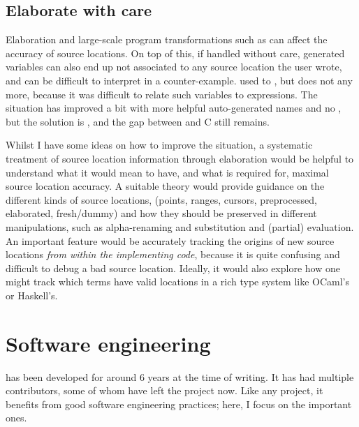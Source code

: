 \subsection{Elaborate with care}

Elaboration and large-scale program transformations such as  can
affect the accuracy of source locations. On top of this, if handled without
care, generated variables can also end up not associated to any source location
the user wrote, and can be difficult to interpret in a counter-example. 
used to , but does not any
more, because it was difficult to relate such variables to 
expressions. The situation has improved a bit with more helpful auto-generated
names and no , but the solution is \adhoc{}, and the gap between
 and C still remains.

Whilst I have some ideas on how to improve the situation, a systematic treatment of source location information through
elaboration would be helpful to understand what it would mean to have, and what is
required for, maximal source location accuracy. A suitable theory would provide
guidance on the different kinds of source locations, (points, ranges, cursors,
preprocessed, elaborated, fresh/dummy) and how they should be preserved in
different manipulations, such as alpha-renaming and substitution and (partial)
evaluation. An important feature would be accurately tracking the origins of
new source locations \emph{from within the implementing code}, because it is
quite confusing and difficult to debug a bad source location. Ideally, it would
also explore how one might track which terms have valid locations in a rich type
system like OCaml's or Haskell's.

\section{Software engineering}

 has been developed for around 6 years at the time of writing. It has
had multiple contributors, some of whom have left the project now. Like any
project, it benefits from good software engineering practices; here, I focus on
the important ones.

